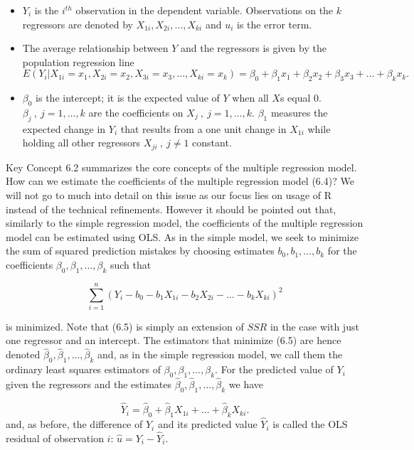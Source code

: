 \documentclass[]{book}
\providecommand{\tightlist}{%
  \setlength{\itemsep}{0pt}\setlength{\parskip}{0pt}}
\theoremstyle{definition}
\theoremstyle{definition}
\theoremstyle{definition}
\theoremstyle{remark}
\begin{document}
\begin{itemize}
\tightlist
\item
  \(Y_i\) is the \(i^{th}\) observation in the dependent variable.
  Observations on the \(k\) regressors are denoted by
  \(X_{1i},X_{2i},\dots,X_{ki}\) and \(u_i\) is the error term.
\item
  The average relationship between \(Y\) and the regressors is given by
  the population regression line
  \[ E(Y_i\vert X_{1i}=x_1, X_{2i}=x_2,  X_{3i}=x_3,\dots, X_{ki}=x_k) = \beta_0 + \beta_1 x_1 + \beta_2 x_2 + \beta_3 x_3 + \dots + \beta_k x_k. \]
\item
  \(\beta_0\) is the intercept; it is the expected value of \(Y\) when
  all \(X\)s equal \(0\). \(\beta_j \ , \ j=1,\dots,k\) are the
  coefficients on \(X_j \ , \ j=1,\dots,k\). \(\beta_1\) measures the
  expected change in \(Y_i\) that results from a one unit change in
  \(X_{1i}\) while holding all other regressors \(X_{ji} \ , \ j\neq1\)
  constant.
\end{itemize}

Key Concept 6.2 summarizes the core concepts of the multiple regression
model. How can we estimate the coefficients of the multiple regression
model (6.4)? We will not go to much into detail on this issue as our
focus lies on usage of R instead of the technical refinements. However
it should be pointed out that, similarly to the simple regression model,
the coefficients of the multiple regression model can be estimated using
OLS. As in the simple model, we seek to minimize the sum of squared
prediction mistakes by choosing estimates \(b_0,b_1,\dots,b_k\) for the
coefficients \(\beta_0,\beta_1,\dots,\beta_k\) such that

\[\sum_{i=1}^n (Y_i - b_0 - b_1 X_{1i} - b_2 X_{2i} - \dots -  b_k X_{ki})^2 \tag{6.5}\]

is minimized. Note that (6.5) is simply an extension of \(SSR\) in the
case with just one regressor and an intercept. The estimators that
minimize (6.5) are hence denoted
\(\hat\beta_0,\hat\beta_1,\dots,\hat\beta_k\) and, as in the simple
regression model, we call them the ordinary least squares estimators of
\(\beta_0,\beta_1,\dots,\beta_k\). For the predicted value of \(Y_i\)
given the regressors and the estimates
\(\hat\beta_0,\hat\beta_1,\dots,\hat\beta_k\) we have

\[ \hat{Y}_i = \hat\beta_0 + \hat\beta_1 X_{1i} + \dots +\hat\beta_k X_{ki}. \]
and, as before, the difference of \(Y_i\) and its predicted value
\(\hat{Y}_i\) is called the OLS residual of observation \(i\):
\(\hat{u} = Y_i - \hat{Y}_i\).
\end{document}

